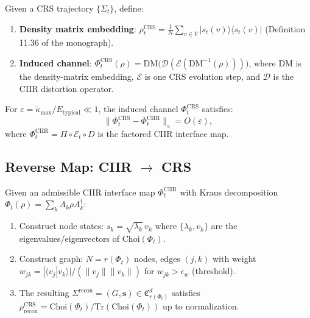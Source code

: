 \begin{definition}\label{def:12.12}
Given a CRS trajectory $\{\Sigma_t\}$, define:
\begin{enumerate}
  \item \textbf{Density matrix embedding}:
    $\rho^{\mathrm{CRS}}_t = \frac{1}{N}\sum_{v \in V} |s_t(v)\rangle\langle s_t(v)|$
    (Definition 11.36 of the monograph).
  \item \textbf{Induced channel}:
    $\Phi_t^{\mathrm{CRS}}(\rho) = \mathrm{DM}\bigl(\mathcal{D}(\mathcal{E}(\mathrm{DM}^{-1}(\rho)))\bigr)$,
    where $\mathrm{DM}$ is the density-matrix embedding, $\mathcal{E}$ is
    one CRS evolution step, and $\mathcal{D}$ is the CIIR distortion operator.
\end{enumerate}
\end{definition}

\begin{theorem}\label{thm:12.8}
For $\varepsilon = \tilde{\kappa}_{\max}/E_{\mathrm{typical}} \ll 1$,
the induced channel $\Phi_t^{\mathrm{CRS}}$ satisfies:
\[
  \|\Phi_t^{\mathrm{CRS}} - \Phi_t^{\mathrm{CIIR}}\|_\diamond
  = O(\varepsilon),
\]
where $\Phi_t^{\mathrm{CIIR}} = \Pi \circ \mathcal{E}_t \circ D$ is the
factored CIIR interface map.
\end{theorem}

\subsection{Reverse Map: CIIR $\to$ CRS}

\begin{definition}\label{def:12.13}
Given an admissible CIIR interface map $\Phi_t^{\mathrm{CIIR}}$ with
Kraus decomposition $\Phi_t(\rho) = \sum_k A_k \rho A_k^\dagger$:
\begin{enumerate}
  \item Construct node states: $s_k = \sqrt{\lambda_k}\,v_k$ where
    $\{\lambda_k, v_k\}$ are the eigenvalues/eigenvectors of
    $\mathrm{Choi}(\Phi_t)$.
  \item Construct graph: $N = r(\Phi_t)$ nodes, edges $(j,k)$ with
    weight $w_{jk} = |\langle v_j | v_k \rangle| / (\|v_j\|\|v_k\|)$
    for $w_{jk} > \epsilon_w$ (threshold).
  \item The resulting $\Sigma^{\mathrm{recon}} = (G, \boldsymbol{s})
    \in \mathfrak{C}_{r(\Phi_t)}^d$ satisfies
    $\rho^{\mathrm{CRS}}_{\mathrm{recon}} = \mathrm{Choi}(\Phi_t) / \mathrm{Tr}(\mathrm{Choi}(\Phi_t))$
    up to normalization.
\end{enumerate}
\end{definition}

